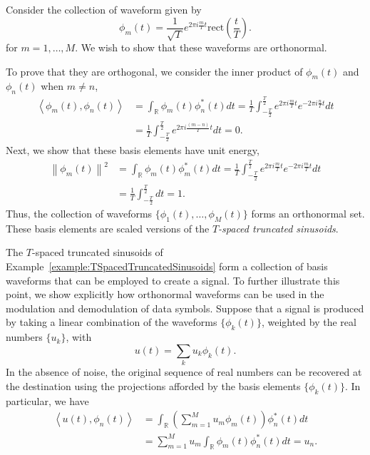 \begin{example} \label{example:TSpacedTruncatedSinusoids}
Consider the collection of waveform given by
\begin{equation*}
\phi_m(t) = \frac{1}{\sqrt{T}} e^{2 \pi i \frac{m}{T} t} \mathrm{rect} \left( \frac{t}{T} \right) .
\end{equation*}
for $m = 1, \ldots, M$.
We wish to show that these waveforms are orthonormal.

To prove that they are orthogonal, we consider the inner product of $\phi_m(t)$ and $\phi_n(t)$ when $m \neq n$,
\begin{equation*}
\begin{split}
\left\langle \phi_m (t), \phi_n (t) \right\rangle
&= \int_{\mathbb{R}} \phi_m (t) \phi_n^* (t) dt 
= \frac{1}{T} \int_{-\frac{T}{2}}^{\frac{T}{2}}
e^{2 \pi i \frac{m}{T} t} e^{- 2 \pi i \frac{n}{T} t} dt \\
&= \frac{1}{T} \int_{-\frac{T}{2}}^{\frac{T}{2}}
e^{2 \pi i \frac{(m-n)}{T} t} dt
= 0 .
\end{split}
\end{equation*}
Next, we show that these basis elements have unit energy,
\begin{equation*}
\begin{split}
\left\| \phi_m(t) \right\|^2
&= \int_{\mathbb{R}} \phi_m (t) \phi_m^* (t) dt 
= \frac{1}{T} \int_{-\frac{T}{2}}^{\frac{T}{2}}
e^{2 \pi i \frac{m}{T} t} e^{- 2 \pi i \frac{m}{T} t} dt \\
&= \frac{1}{T} \int_{-\frac{T}{2}}^{\frac{T}{2}} dt
= 1 .
\end{split}
\end{equation*}
Thus, the collection of waveforms $\{ \phi_1 (t), \ldots, \phi_M (t) \}$ forms an orthonormal set.
These basis elements are scaled versions of the \emph{$T$-spaced truncated sinusoids}.
\end{example}

The $T$-spaced truncated sinusoids of Example~\ref{example:TSpacedTruncatedSinusoids} form a collection of basis waveforms that can be employed to create a signal.
To further illustrate this point, we show explicitly how orthonormal waveforms can be used in the modulation and demodulation of data symbols.
Suppose that a signal is produced by taking a linear combination of the waveforms $\{ \phi_k(t) \}$, weighted by the real numbers $\{ u_k \}$, with
\begin{equation*}
u(t) = \sum_{k} u_k \phi_k(t) .
\end{equation*}
In the absence of noise, the original sequence of real numbers can be recovered at the destination using the projections afforded by the basis elements $\{ \phi_k (t) \}$.
In particular, we have
\begin{equation*}
\begin{split}
\left\langle u(t), \phi_n(t) \right\rangle
&= \int_{\mathbb{R}}
\left( \sum_{m=1}^M u_m \phi_m(t) \right) \phi_n^*(t) dt \\
&= \sum_{m=1}^M u_m \int_{\mathbb{R}}
\phi_m(t) \phi_n^*(t) dt
= u_n .
\end{split}
\end{equation*}

